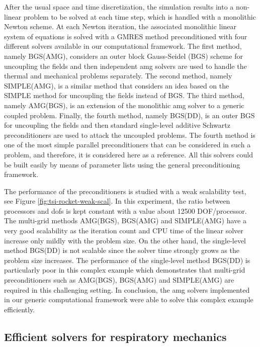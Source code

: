\documentclass{article}
\begin{document}
After the usual space and time discretization, the simulation results into a non-linear problem to be solved at each time step, which is handled with a monolithic Newton scheme. At each Newton iteration, the associated monolithic linear system of equations is solved with a GMRES method preconditioned with four different solvers available in our computational framework. The first method, namely BGS(AMG), considers an outer block Gauss-Seidel (BGS) scheme for uncoupling the fields and then independent \ac{amg} solvers are used to handle the  thermal and mechanical problems separately. The second method, namely SIMPLE(AMG), is a similar method that considers an idea based on the SIMPLE method \cite{elman_2008} for uncoupling the fields instead of BGS. The third method, namely AMG(BGS), is an extension of the monolithic \ac{amg} solver to a generic coupled problem. Finally, the fourth method, namely BGS(DD), is an outer BGS for uncoupling the fields and then standard single-level additive Schwartz preconditioners are used to attack the uncoupled problems. The fourth  method is one of the most simple parallel preconditioners that can be considered in such a problem, and therefore, it is considered here as a reference.  All this solvers could be built easily by means of parameter lists using the general preconditioning framework. 

The performance of the preconditioners is studied with a weak scalability test, see Figure \ref{fig:tsi-rocket-weak-scal}. In this experiment, the ratio between processors and \acp{dof} is kept constant with a value about 12500  DOF/processor. The multi-grid methods AMG(BGS), BGS(AMG) and SIMPLE(AMG) have a very good scalability as the iteration count and CPU time of the linear solver increase only mildly with the problem size. On the other hand, the single-level method BGS(DD) is not scalable since the solver time strongly  grows as the problem size increases. The performance of the single-level method BGS(DD) is particularly poor in this complex example which demonstrates that multi-grid preconditioners such as  AMG(BGS), BGS(AMG) and SIMPLE(AMG) are required in this challenging setting.  In conclusion, the \ac{amg} solvers implemented in our generic computational framework were able to solve this complex example efficiently.

\subsection{Efficient solvers for respiratory mechanics}
\end{document}
